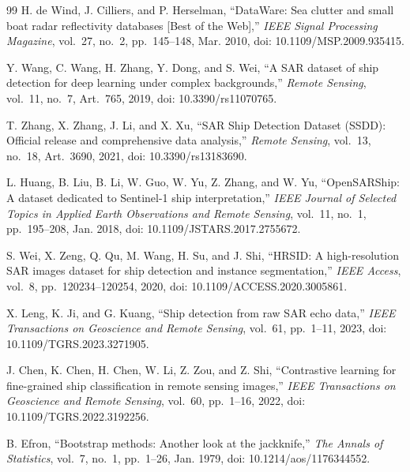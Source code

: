 \documentclass[journal]{IEEEtran}
\begin{document}
\begin{thebibliography}{99}
H. de Wind, J. Cilliers, and P. Herselman, ``DataWare: Sea clutter and small boat radar reflectivity databases [Best of the Web],'' \emph{IEEE Signal Processing Magazine}, vol.~27, no.~2, pp.~145--148, Mar. 2010, doi: 10.1109/MSP.2009.935415.

Y. Wang, C. Wang, H. Zhang, Y. Dong, and S. Wei, ``A SAR dataset of ship detection for deep learning under complex backgrounds,'' \emph{Remote Sensing}, vol.~11, no.~7, Art.~765, 2019, doi: 10.3390/rs11070765.

T. Zhang, X. Zhang, J. Li, and X. Xu, ``SAR Ship Detection Dataset (SSDD): Official release and comprehensive data analysis,'' \emph{Remote Sensing}, vol.~13, no.~18, Art.~3690, 2021, doi: 10.3390/rs13183690.

L. Huang, B. Liu, B. Li, W. Guo, W. Yu, Z. Zhang, and W. Yu, ``OpenSARShip: A dataset dedicated to Sentinel-1 ship interpretation,'' \emph{IEEE Journal of Selected Topics in Applied Earth Observations and Remote Sensing}, vol.~11, no.~1, pp.~195--208, Jan. 2018, doi: 10.1109/JSTARS.2017.2755672.

S. Wei, X. Zeng, Q. Qu, M. Wang, H. Su, and J. Shi, ``HRSID: A high-resolution SAR images dataset for ship detection and instance segmentation,'' \emph{IEEE Access}, vol.~8, pp.~120234--120254, 2020, doi: 10.1109/ACCESS.2020.3005861.

X. Leng, K. Ji, and G. Kuang, ``Ship detection from raw SAR echo data,'' \emph{IEEE Transactions on Geoscience and Remote Sensing}, vol.~61, pp.~1--11, 2023, doi: 10.1109/TGRS.2023.3271905.

J. Chen, K. Chen, H. Chen, W. Li, Z. Zou, and Z. Shi, ``Contrastive learning for fine-grained ship classification in remote sensing images,'' \emph{IEEE Transactions on Geoscience and Remote Sensing}, vol.~60, pp.~1--16, 2022, doi: 10.1109/TGRS.2022.3192256.

B. Efron, ``Bootstrap methods: Another look at the jackknife,'' \emph{The Annals of Statistics}, vol.~7, no.~1, pp.~1--26, Jan. 1979, doi: 10.1214/aos/1176344552.

\end{thebibliography}
\endgroup
\end{document}
